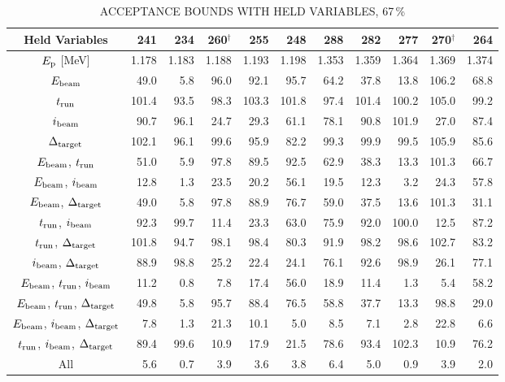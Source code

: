 \begin{landscape}
\begin{table}
    \begin{center}
        \begin{longtable}{crrrrrrrrrr}
        \caption{ACCEPTANCE BOUNDS WITH HELD VARIABLES, 67\,\%}
        \label{tab:acceptance-uncertainty-67}
            \toprule
            \midrule
            \textbf{Held Variables}
                & \textbf{241} & \textbf{234} & \textbf{260}$^\dagger$ & \textbf{255} & \textbf{248}
                & \textbf{288} & \textbf{282} & \textbf{277} & \textbf{270}$^\dagger$ & \textbf{264} \\
            \midrule
$E_{\rm p}$ [MeV] & 1.178 & 1.183 & 1.188 & 1.193 & 1.198 & 1.353 & 1.359 & 1.364 & 1.369 & 1.374 \\
\midrule
$E_{\rm beam}$ &  49.0 &   5.8 &  96.0 &  92.1 &  95.7 &  64.2 &  37.8 &
    13.8 & 106.2 &  68.8 \\
$t_{\rm run}$ & 101.4 &  93.5 &  98.3 & 103.3 & 101.8 &  97.4 & 101.4 &
    100.2 & 105.0 &  99.2 \\
$i_{\rm beam}$ &  90.7 &  96.1 &  24.7 &  29.3 &  61.1 &  78.1 &  90.8 &
    101.9 &  27.0 &  87.4 \\
$\Delta_{\rm target}$ & 102.1 &  96.1 &  99.6 &  95.9 &  82.2 &  99.3 &
    99.9 &  99.5 & 105.9 &  85.6 \\
$E_{\rm beam}$, $t_{\rm run}$ &  51.0 &   5.9 &  97.8 &  89.5 &  92.5 &
    62.9 &  38.3 &  13.3 & 101.3 &  66.7 \\
$E_{\rm beam}$, $i_{\rm beam}$ &  12.8 &   1.3 &  23.5 &  20.2 &  56.1 &
    19.5 &  12.3 &   3.2 &  24.3 &  57.8 \\
$E_{\rm beam}$, $\Delta_{\rm target}$ &  49.0 &   5.8 &  97.8 &  88.9 &
    76.7 &  59.0 &  37.5 &  13.6 & 101.3 &  31.1 \\
$t_{\rm run}$, $i_{\rm beam}$ &  92.3 &  99.7 &  11.4 &  23.3 &  63.0 &
    75.9 &  92.0 & 100.0 &  12.5 &  87.2 \\
$t_{\rm run}$, $\Delta_{\rm target}$ & 101.8 &  94.7 &  98.1 &  98.4 &
    80.3 &  91.9 &  98.2 &  98.6 & 102.7 &  83.2 \\
$i_{\rm beam}$, $\Delta_{\rm target}$ &  88.9 &  98.8 &  25.2 &  22.4 &
    24.1 &  76.1 &  92.6 &  98.9 &  26.1 &  77.1 \\
$E_{\rm beam}$, $t_{\rm run}$, $i_{\rm beam}$ &  11.2 &   0.8 &   7.8 &
    17.4 &  56.0 &  18.9 &  11.4 &   1.3 &   5.4 &  58.2 \\
$E_{\rm beam}$, $t_{\rm run}$, $\Delta_{\rm target}$ &  49.8 &   5.8 &
    95.7 &  88.4 &  76.5 &  58.8 &  37.7 &  13.3 &  98.8 &  29.0 \\
$E_{\rm beam}$, $i_{\rm beam}$, $\Delta_{\rm target}$ &   7.8 &   1.3 &
    21.3 &  10.1 &   5.0 &   8.5 &   7.1 &   2.8 &  22.8 &   6.6 \\
$t_{\rm run}$, $i_{\rm beam}$, $\Delta_{\rm target}$ &  89.4 &  99.6 &
    10.9 &  17.9 &  21.5 &  78.6 &  93.4 & 102.3 &  10.9 &  76.2 \\
All &   5.6 &   0.7 &   3.9 &   3.6 &   3.8 &   6.4 &   5.0 &   0.9 &
    3.9 &   2.0 \\
            \bottomrule
        \end{longtable}


\end{center}
\end{table}
\end{landscape}
